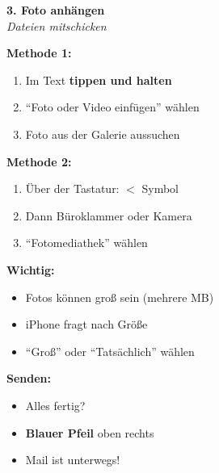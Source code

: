 \documentclass[a4paper,landscape,8pt]{extarticle}
\begin{document}
\begin{minipage}[t]{0.32\linewidth}
\begin{center}
\colorbox{attachorange!10}{%
\begin{minipage}{0.95\linewidth}
\vspace{2mm}
\begin{center}
{\Large\bfseries\textcolor{attachorange}{3. Foto anhängen}}\\[1pt]
{\footnotesize\itshape Dateien mitschicken}
\end{center}
\vspace{2mm}
\end{minipage}%
}
\end{center}

\vspace{1mm}

\textbf{Methode 1:}
\begin{enumerate}
\item Im Text \textbf{tippen und halten}
\item ``Foto oder Video einfügen'' wählen
\item Foto aus der Galerie aussuchen
\end{enumerate}

\textbf{Methode 2:}
\begin{enumerate}
\item Über der Tastatur: \textbf{$<$} Symbol
\item Dann Büroklammer oder Kamera
\item ``Fotomediathek'' wählen
\end{enumerate}

\textbf{Wichtig:}
\begin{itemize}
\item Fotos können groß sein (mehrere MB)
\item iPhone fragt nach Größe
\item ``Groß'' oder ``Tatsächlich'' wählen
\end{itemize}

\textbf{Senden:}
\begin{itemize}
\item Alles fertig?
\item \textbf{Blauer Pfeil} oben rechts
\item Mail ist unterwegs!
\end{itemize}

\end{minipage}

\vspace{1mm}
\end{document}
